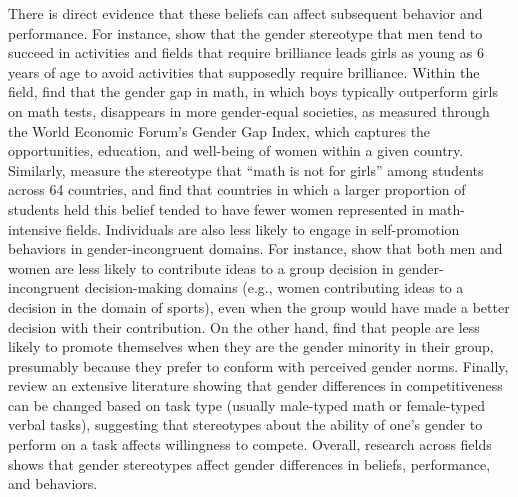 \documentclass[a4paper, nobind]{templates/ociamthesis}
\begin{document}
There is direct evidence that these beliefs can affect subsequent behavior and performance. For instance, \textcite{Bian2017} show that the gender stereotype that men tend to succeed in activities and fields that require brilliance leads girls as young as 6 years of age to avoid activities that supposedly require brilliance. Within the field, \textcite{Guiso2008} find that the gender gap in math, in which boys typically outperform girls on math tests, disappears in more gender-equal societies, as measured through the World Economic Forum's Gender Gap Index, which captures the opportunities, education, and well-being of women within a given country. Similarly, \textcite{Breda2020} measure the stereotype that ``math is not for girls'' among students across 64 countries, and find that countries in which a larger proportion of students held this belief tended to have fewer women represented in math-intensive fields. Individuals are also less likely to engage in self-promotion behaviors in gender-incongruent domains. For instance, \textcite{Coffman2014} show that both men and women are less likely to contribute ideas to a group decision in gender-incongruent decision-making domains (e.g., women contributing ideas to a decision in the domain of sports), even when the group would have made a better decision with their contribution. On the other hand, \textcite{Coffman2021a} find that people are less likely to promote themselves when they are the gender minority in their group, presumably because they prefer to conform with perceived gender norms. Finally, \textcite{Niederle2011} review an extensive literature showing that gender differences in competitiveness can be changed based on task type (usually male-typed math or female-typed verbal tasks), suggesting that stereotypes about the ability of one's gender to perform on a task affects willingness to compete. Overall, research across fields shows that gender stereotypes affect gender differences in beliefs, performance, and behaviors.
\end{document}
